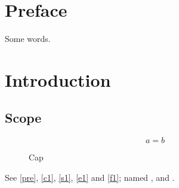 \documentclass{report}
\begin{document}
\chapter*{Preface}\label{pre}
Some words.
\chapter{Introduction}\label{c1}
\section{Scope}\label{s1}
\begin{equation} a=b \label{e1}\end{equation}
\begin{figure}[h]\centering\caption{Cap}\label{f1}\end{figure}
See \autoref{pre}, \autoref{c1}, \autoref{s1}, \autoref{e1} and \autoref{f1}; named ,  and .
\end{document}

